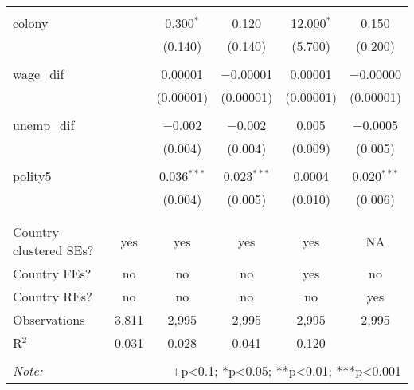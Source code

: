 \documentclass[11pt,]{article}
\begin{document}
\begin{table}[!htbp]
\begin{tabular}{@{\extracolsep{5pt}}lccccc}
  & & & & & \\ 
 colony &  & 0.300$^{*}$ & 0.120 & 12.000$^{*}$ & 0.150 \\ 
  &  & (0.140) & (0.140) & (5.700) & (0.200) \\ 
  & & & & & \\ 
 wage\_dif &  & 0.00001 & $-$0.00001 & 0.00001 & $-$0.00000 \\ 
  &  & (0.00001) & (0.00001) & (0.00001) & (0.00001) \\ 
  & & & & & \\ 
 unemp\_dif &  & $-$0.002 & $-$0.002 & 0.005 & $-$0.0005 \\ 
  &  & (0.004) & (0.004) & (0.009) & (0.005) \\ 
  & & & & & \\ 
 polity5 &  & 0.036$^{***}$ & 0.023$^{***}$ & 0.0004 & 0.020$^{***}$ \\ 
  &  & (0.004) & (0.005) & (0.010) & (0.006) \\ 
  & & & & & \\ 
\hline \\[-1.8ex] 
Country-clustered SEs? & yes & yes & yes & yes & NA \\ 
Country FEs? & no & no & no & yes & no \\ 
Country REs? & no & no & no & no & yes \\ 
Observations & 3,811 & 2,995 & 2,995 & 2,995 & 2,995 \\ 
R$^{2}$ & 0.031 & 0.028 & 0.041 & 0.120 &  \\ 
\hline 
\hline \\[-1.8ex] 
\textit{Note:}  & \multicolumn{5}{r}{+p<0.1; *p<0.05; **p<0.01; ***p<0.001} \\ 
\end{tabular} 
\end{table}
\end{document}
